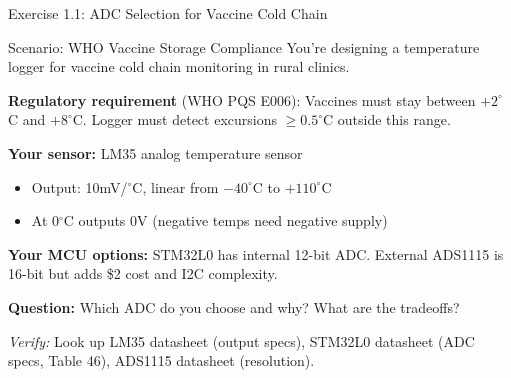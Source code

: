 \documentclass[aspectratio=169,11pt]{beamer}
\begin{document}
\begin{frame}{Exercise 1.1: ADC Selection for Vaccine Cold Chain}
    \begin{block}{Scenario: WHO Vaccine Storage Compliance}
        You're designing a temperature logger for vaccine cold chain monitoring in rural clinics.
        
        \vspace{0.2cm}
        \textbf{Regulatory requirement} (WHO PQS E006): Vaccines must stay between $+2^\circ$C and $+8^\circ$C. Logger must detect excursions $\geq 0.5^\circ$C outside this range.
        
        \vspace{0.2cm}
        \textbf{Your sensor:} LM35 analog temperature sensor
        \begin{itemize}
            \item Output: 10mV/$^\circ$C, linear from $-40^\circ$C to $+110^\circ$C
            \item At 0$^\circ$C outputs 0V (negative temps need negative supply)
        \end{itemize}
        
        \vspace{0.2cm}
        \textbf{Your MCU options:} STM32L0 has internal 12-bit ADC. External ADS1115 is 16-bit but adds \$2 cost and I2C complexity.
    \end{block}
    
    \textbf{Question:} Which ADC do you choose and why? What are the tradeoffs?
    
    \vspace{0.1cm}
    {\footnotesize \textit{Verify:} Look up LM35 datasheet (output specs), STM32L0 datasheet (ADC specs, Table 46), ADS1115 datasheet (resolution).}
\end{frame}
\end{document}
